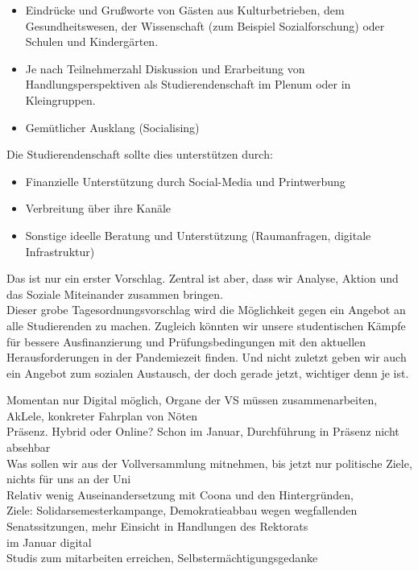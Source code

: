 {\begin{itemize}
            \item Eindrücke und Grußworte von Gästen aus Kulturbetrieben, dem Gesundheitswesen, der
                Wissenschaft (zum Beispiel Sozialforschung) oder Schulen und Kindergärten.
            \item Je nach Teilnehmerzahl Diskussion und Erarbeitung von Handlungsperspektiven als
                Studierendenschaft im Plenum oder in Kleingruppen.
            \item Gemütlicher Ausklang (Socialising)
        \end{itemize}
        Die Studierendenschaft sollte dies unterstützen durch:
        \begin{itemize}
            \item Finanzielle Unterstützung durch Social-Media und Printwerbung
            \item Verbreitung über ihre Kanäle
            \item Sonstige ideelle Beratung und Unterstützung (Raumanfragen, digitale Infrastruktur)
        \end{itemize}
        Das ist nur ein erster Vorschlag. Zentral ist aber, dass wir Analyse, Aktion und das Soziale
        Miteinander zusammen bringen.\\
        Dieser grobe Tagesordnungsvorschlag wird die Möglichkeit gegen ein Angebot an alle Studierenden
        zu machen. Zugleich könnten wir unsere studentischen Kämpfe für bessere Ausfinanzierung und
        Prüfungsbedingungen mit den aktuellen Herausforderungen in der Pandemiezeit finden. Und nicht
        zuletzt geben wir auch ein Angebot zum sozialen Austausch, der doch gerade jetzt, wichtiger denn je ist.
    }{
        Momentan nur Digital möglich, Organe der VS müssen zusammenarbeiten, AkLele, konkreter Fahrplan von Nöten\\
        Präsenz. Hybrid oder Online? Schon im Januar, Durchführung in Präsenz nicht absehbar\\
        Was sollen wir aus der Vollversammlung mitnehmen, bis jetzt nur politische Ziele, nichts für uns an der Uni\\
            Relativ wenig Auseinandersetzung mit Coona und den Hintergründen, \\
            Ziele: Solidarsemesterkampange, Demokratieabbau wegen wegfallenden Senatssitzungen, mehr Einsicht in Handlungen des Rektorats\\
            im Januar digital\\
            Studis zum mitarbeiten erreichen, Selbstermächtigungsgedanke\\
}
